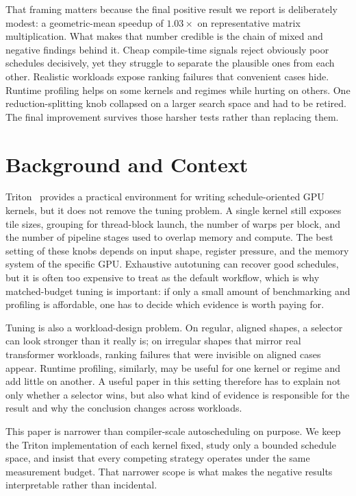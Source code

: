 \documentclass[10pt,twocolumn]{article}
\begin{document}
That framing matters because the final positive result we report is deliberately modest: a geometric-mean speedup of $1.03\times$ on representative matrix multiplication. What makes that number credible is the chain of mixed and negative findings behind it. Cheap compile-time signals reject obviously poor schedules decisively, yet they struggle to separate the plausible ones from each other. Realistic workloads expose ranking failures that convenient cases hide. Runtime profiling helps on some kernels and regimes while hurting on others. One reduction-splitting knob collapsed on a larger search space and had to be retired. The final improvement survives those harsher tests rather than replacing them.

\section{Background and Context}

Triton~\citep{tillet2019triton,openai2021triton} provides a practical environment for writing schedule-oriented GPU kernels, but it does not remove the tuning problem. A single kernel still exposes tile sizes, grouping for thread-block launch, the number of warps per block, and the number of pipeline stages used to overlap memory and compute. The best setting of these knobs depends on input shape, register pressure, and the memory system of the specific GPU. Exhaustive autotuning can recover good schedules, but it is often too expensive to treat as the default workflow, which is why matched-budget tuning is important: if only a small amount of benchmarking and profiling is affordable, one has to decide which evidence is worth paying for.

Tuning is also a workload-design problem. On regular, aligned shapes, a selector can look stronger than it really is; on irregular shapes that mirror real transformer workloads, ranking failures that were invisible on aligned cases appear. Runtime profiling, similarly, may be useful for one kernel or regime and add little on another. A useful paper in this setting therefore has to explain not only whether a selector wins, but also what kind of evidence is responsible for the result and why the conclusion changes across workloads.

This paper is narrower than compiler-scale autoscheduling on purpose. We keep the Triton implementation of each kernel fixed, study only a bounded schedule space, and insist that every competing strategy operates under the same measurement budget. That narrower scope is what makes the negative results interpretable rather than incidental.
\end{document}
